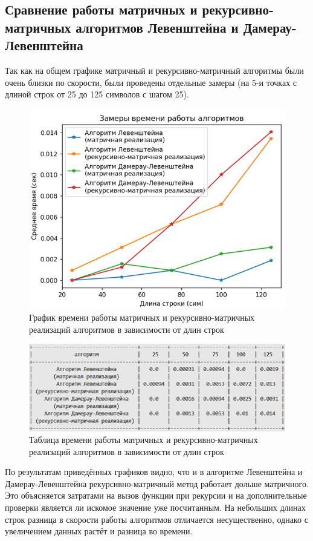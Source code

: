 \subsection{Сравнение работы матричных и рекурсивно-матричных алгоритмов Левенштейна и Дамерау-Левенштейна}
Так как на общем графике матричный и рекурсивно-матричный алгоритмы были очень близки по скорости, были проведены отдельные замеры (на 5-и точках с длиной строк от 25 до 125 символов с шагом 25).
\begin{figure}[H]
    \centering
    \includegraphics[width=1\textwidth]{img/graph_mat_rec-mat.png}
    \caption{График времени работы матричных и рекурсивно-матричных реализаций алгоритмов в зависимости от длин строк}
\end{figure}
\begin{figure}[H]
    \centering
    \includegraphics[width=1\textwidth]{img/table_mat_rec-mat.png}
    \caption{Таблица времени работы матричных и рекурсивно-матричных реализаций алгоритмов в зависимости от длин строк}
\end{figure}

По результатам приведённых графиков видно, что и в алгоритме Левенштейна и Дамерау-Левенштейна рекурсивно-матричный метод работает дольше матричного. Это объясняется затратами на вызов функции при рекурсии и на дополнительные проверки является ли искомое значение уже посчитанным. На небольших длинах строк разница в скорости работы алгоритмов отличается несущественно, однако с увеличением данных растёт и разница во времени.

